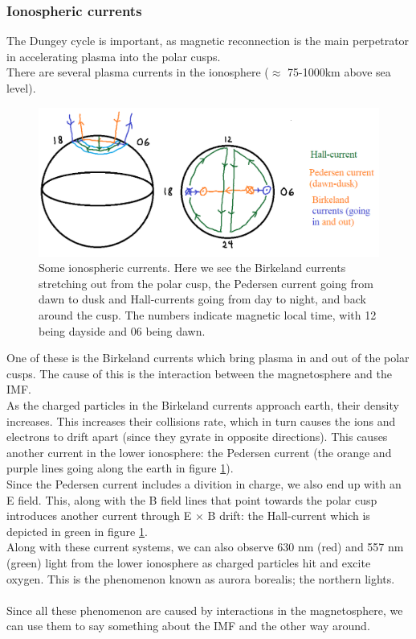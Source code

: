\documentclass[norsk,a4paper,11pt]{article}
\begin{document}
\begin{multicols}{2}
	\subsubsection{Ionospheric currents}
	The Dungey cycle is important, as magnetic reconnection is the main perpetrator in accelerating plasma into the polar cusps.\\
	There are several plasma currents in the ionosphere ($\approx$ 75-1000km above sea level).
	\begin{figure}[H]
		\includegraphics[scale = 0.4]{Figures/ionosphere_currents.png}
		\centering
		\caption{Some ionospheric currents. Here we see the Birkeland currents stretching out from the polar cusp, the Pedersen current going from dawn to dusk and Hall-currents going from day to night, and back around the cusp. The numbers indicate magnetic local time, with 12 being dayside 			and 06 being dawn.}
		\label{fig::ionosphere}
	\end{figure}
	One of these is the Birkeland currents which bring plasma in and out of the polar cusps. The cause of this is the interaction between the magnetosphere and 	the IMF.\\
	As the charged particles in the Birkeland currents approach earth, their density increases. This increases their collisions rate, which in turn causes the ions 			and electrons to drift apart (since they gyrate in opposite directions). This causes another current in the lower ionosphere: the Pedersen current (the orange 	and purple lines 	going along the earth in figure \ref{fig::ionosphere}).\\
	Since the Pedersen current includes a divition in charge, we also end up with an E field. This, along with the B field lines that point towards the polar cusp 			introduces another current through E $\times$ B drift: the Hall-current which is depicted in green in figure \ref{fig::ionosphere}.\\
	Along with these current systems, we can also observe 630 nm (red) and 557 nm (green) light from the lower ionosphere as charged particles hit and 			excite oxygen. This is the phenomenon known as aurora borealis; the northern lights.\\
	\\
	Since all these phenomenon are caused by interactions in the magnetosphere, we can use them to say something about the IMF and the other way around. 	



\end{multicols}
\end{document}
